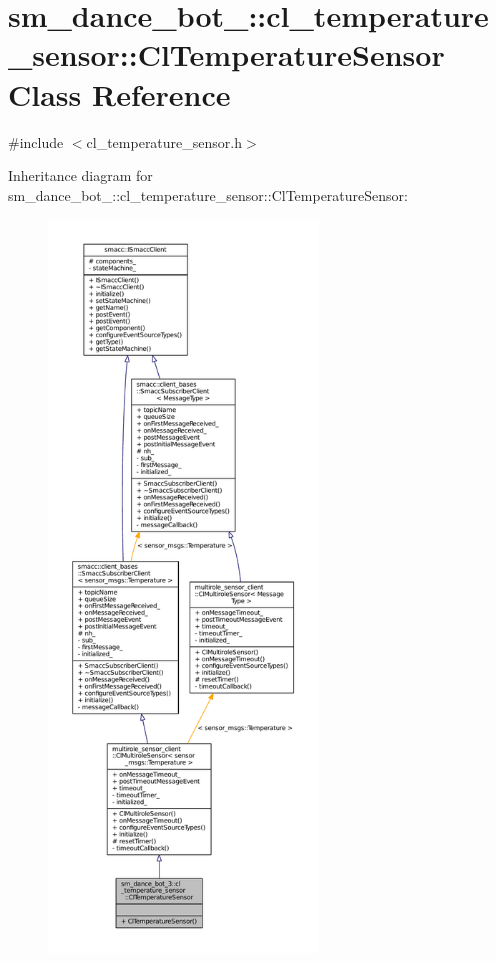 \hypertarget{classsm__dance__bot__3_1_1cl__temperature__sensor_1_1ClTemperatureSensor}{}\section{sm\+\_\+dance\+\_\+bot\+\_\+:\+:cl\+\_\+temperature\+\_\+sensor\+:\+:Cl\+Temperature\+Sensor Class Reference}
\label{classsm__dance__bot__3_1_1cl__temperature__sensor_1_1ClTemperatureSensor}


{\ttfamily \#include $<$cl\+\_\+temperature\+\_\+sensor.\+h$>$}



Inheritance diagram for sm\+\_\+dance\+\_\+bot\+\_\+:\+:cl\+\_\+temperature\+\_\+sensor\+:\+:Cl\+Temperature\+Sensor\+:
\nopagebreak
\begin{figure}[H]
\begin{center}
\leavevmode
\includegraphics[height=550pt]{classsm__dance__bot__3_1_1cl__temperature__sensor_1_1ClTemperatureSensor__inherit__graph}
\end{center}
\end{figure}


